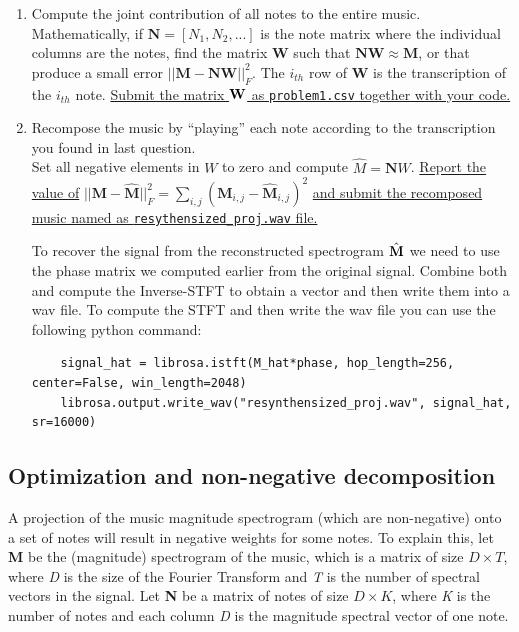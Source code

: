 \begin{enumerate}
    \item Compute the joint contribution of all notes to the entire music. \\ 
    Mathematically, if $\mathbf{N} = [N_{1}, N_{2}, ...]$ is the note matrix where the individual columns are the notes, find the matrix $\mathbf{W}$ such that $\mathbf{N}\mathbf{W}\approx\mathbf{M}$, or that produce a small error $||\mathbf{M}-\mathbf{NW}||_{F}^{2}$. The $i_{th}$ row of $\mathbf{W}$ is the transcription of the  $i_{th}$ note. \underline{Submit the matrix ${\bf W}$ as  \texttt{problem1.csv} together with your code.}
    
    \item Recompose the music by ``playing'' each note according to the transcription you found in last question. \\ Set all negative elements in $W$ to zero and compute $\hat{M} = \mathbf{N}W$. \ul{Report the value of} $||\mathbf{M}-\hat{\mathbf{M}}||_{F}^{2} =  \sum_{i,j}(\mathbf{M}_{i,j}-\hat{\mathbf{M}}_{i,j})^{2}$ \ul{and submit the recomposed music named as \texttt{resythensized\_proj.wav} file.}
    
    To recover the signal from the reconstructed spectrogram $\hat{{\bf M}}$ we need to use the phase matrix we computed earlier from the original signal. Combine both and compute the Inverse-STFT to obtain a vector and then write them into a wav file. To compute the STFT and then write the wav file you can use the following python command:
    \begin{lstlisting}
    signal_hat = librosa.istft(M_hat*phase, hop_length=256, center=False, win_length=2048)
    librosa.output.write_wav("resynthensized_proj.wav", signal_hat, sr=16000)
    \end{lstlisting}
\end{enumerate}


\subsection{Optimization and non-negative decomposition}

A projection of the music magnitude spectrogram (which are non-negative) onto a set of notes will result in negative weights for some notes. To explain this, let \textbf{M} be the (magnitude) spectrogram of the music, which is a matrix of size $D\times T$, where \textit{D} is the size of the Fourier Transform and \textit{T} is the number of spectral vectors in the signal. Let \textbf{N} be a matrix of notes of size $D\times K$, where \textit{K} is the number of notes and each column \textit{D} is the magnitude spectral vector of one note.

